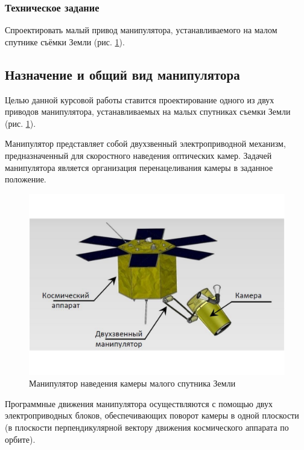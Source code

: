 \ifdefined{\DIPLOMA}
    \subsubsection{Техническое задание}

    Спроектировать малый привод манипулятора, устанавливаемого на малом спутнике
    съёмки Земли (рис. \ref{sattelite_general_view}).
\else
    \subsection{Назначение и общий вид манипулятора}

    Целью данной курсовой работы ставится проектирование одного из двух
    приводов манипулятора, устанавливаемых на малых спутниках съемки Земли
    (рис. \ref{sattelite_general_view}).
\fi

Манипулятор представляет собой двухзвенный электроприводной механизм,
предназначенный для скоростного наведения оптических камер.
Задачей манипулятора является организация перенацеливания камеры в заданное положение.

\begin{figure}[h!]
    \centering
    \includegraphics[width=\textwidth, keepaspectratio, clip=true, trim=3cm 3cm 3cm 3cm]
                    {./src/pictures/sattelite_3d_images/general_view}
    \caption{Манипулятор наведения камеры малого спутника Земли}
    \label{sattelite_general_view}
\end{figure}

Программные движения манипулятора осуществляются с помощью двух электроприводных блоков,
обеспечивающих поворот камеры в одной плоскости (в плоскости перпендикулярной
вектору движения космического аппарата по орбите).

